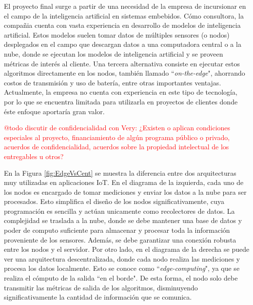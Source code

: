 \documentclass[
11pt, %
codirector, %
]{charter}
\begin{document}
El proyecto final surge a partir de una necesidad de la empresa \empclientename  de incursionar en el campo de la inteligencia artificial en sistemas embebidos. Cómo consultora, la compañia cuenta con vasta experiencia en desarrollo de modelos de inteligencia artificial. Estos modelos suelen tomar datos de múltiples sensores (o nodos) desplegados en el campo que descargan datos a una computadora central o a la nube, donde se ejecutan los modelos de inteligencia artificial y se proveen métricas de interés al cliente. Una tercera alternativa consiste en ejecutar estos algoritmos directamente en los nodos, también llamado ``\textit{on-the-edge}", ahorrando costos de transmisión y uso de batería, entre otras importantes ventajas. Actualmente, la empresa no cuenta con experiencia en este tipo de tecnología, por lo que se encuentra limitada para utilizarla en proyectos de clientes donde éste enfoque aportaría gran valor.

\textcolor{red}{@todo discutir de confidencialidad con Very: ¿Existen o aplican condiciones especiales al proyecto, financiamiento de algún programa público o privado, acuerdos de confidencialidad, acuerdos sobre la propiedad intelectual de los entregables u otros?}

En la Figura \ref{fig:EdgeVsCent} se muestra la diferencia entre dos arquitecturas muy utilizadas en aplicaciones IoT. En el diagrama de la izquierda, cada uno de los nodos es encargado de tomar mediciones y enviar los datos a la nube para ser procesados. Esto simplifica el diseño de los nodos significativamente, cuya programación es sencilla y actúan unicamente como recolectores de datos. La complejidad se traslada a la nube, donde se debe mantener una base de datos y poder de computo suficiente para almacenar y procesar toda la información proveniente de los sensores. Además, se debe garantizar una conexión robusta entre los nodos y el servidor. Por otro lado, en el diagrama de la derecha se puede ver una arquitectura descentralizada, donde cada nodo realiza las mediciones y procesa los datos localmente. Esto se conoce como ``\textit{edge-computing}", ya que se realiza el cómputo de la salida ``en el borde". De esta forma, el nodo solo debe transmitir las métricas de salida de los algoritmos, disminuyendo significativamente la cantidad de información que se comunica.
\end{document}
